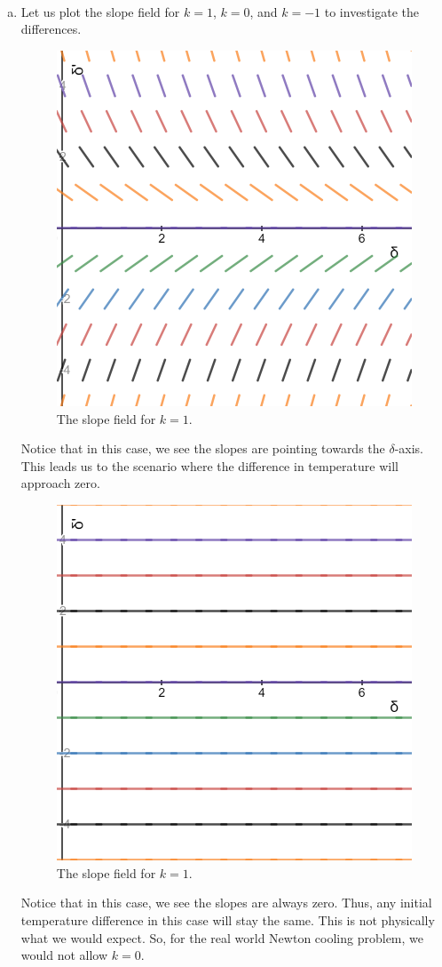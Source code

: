 \documentclass[12pt]{article} %
\begin{document}
\begin{solution}~
\begin{enumerate}[(a)]
    \item Let us plot the slope field for $k=1$, $k=0$, and $k=-1$ to investigate the differences.  
    \begin{figure}[H]
        \centering
        \includegraphics[width=.4\textwidth]{slope_field_k=1.png}
        \caption{The slope field for $k=1$.}
    \end{figure}
    Notice that in this case, we see the slopes are pointing towards the $\delta$-axis. This leads us to the scenario where the difference in temperature will approach zero.\\
    
    \begin{figure}[H]
        \centering
        \includegraphics[width=.4\textwidth]{slope_field_k=0.png}
        \caption{The slope field for $k=1$.}
    \end{figure}
    Notice that in this case, we see the slopes are always zero.  Thus, any initial temperature difference in this case will stay the same.  This is not physically what we would expect. So, for the real world Newton cooling problem, we would not allow $k=0$.\\
    

\end{enumerate}
\end{solution}
\end{document}
